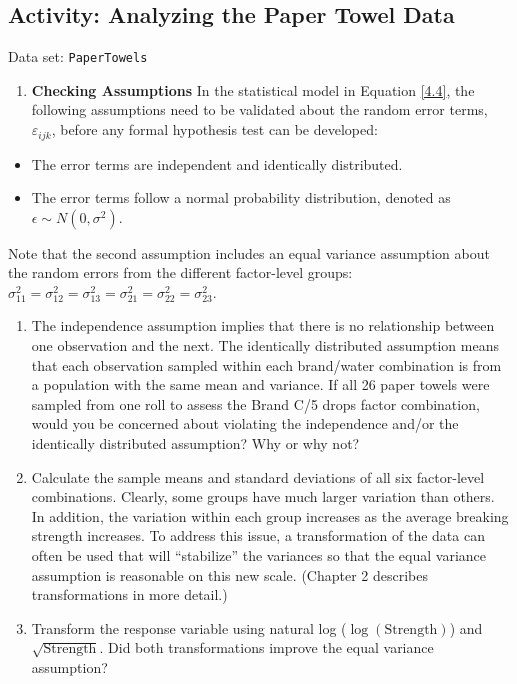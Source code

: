 \documentclass[
]{book}
\providecommand{\tightlist}{%
  \setlength{\itemsep}{0pt}\setlength{\parskip}{0pt}}
\begin{document}
\hypertarget{activity-analyzing-the-paper-towel-data}{%
\subsection*{Activity: Analyzing the Paper Towel Data}\label{activity-analyzing-the-paper-towel-data}}

Data set: \texttt{PaperTowels}

\begin{enumerate}
\def\labelenumi{\arabic{enumi}.}
\setcounter{enumi}{33}
\tightlist
\item
  \textbf{Checking Assumptions} In the statistical model in Equation \ref{4.4}, the following assumptions need to be validated about the random error terms, \(\varepsilon_{ijk}\), before any formal hypothesis test can be developed:
\end{enumerate}

\begin{itemize}
\tightlist
\item
  The error terms are independent and identically distributed.
\item
  The error terms follow a normal probability distribution, denoted as \(\epsilon \sim N(0, \sigma^2)\).
\end{itemize}

Note that the second assumption includes an equal variance assumption about the random errors from the different factor-level groups: \(\sigma_{11}^2 = \sigma_{12}^2 = \sigma_{13}^2 = \sigma_{21}^2 = \sigma_{22}^2 = \sigma_{23}^2\).

\begin{enumerate}
\def\labelenumi{\alph{enumi}.}
\item
  The independence assumption implies that there is no relationship between one observation and the next. The identically distributed assumption means that each observation sampled within each brand/water combination is from a population with the same mean and variance. If all 26 paper towels were sampled from one roll to assess the Brand C/5 drops factor combination, would you be concerned about violating the independence and/or the identically distributed assumption? Why or why not?
\item
  Calculate the sample means and standard deviations of all six factor-level combinations. Clearly, some groups have much larger variation than others. In addition, the variation within each group increases as the average breaking strength increases. To address this issue, a transformation of the data can often be used that will ``stabilize'' the variances so that the equal variance assumption is reasonable on this new scale. (Chapter 2 describes transformations in more detail.)
\item
  Transform the response variable using natural log (\(\log(\text{Strength})\)) and \(\sqrt{\text{Strength}}\). Did both transformations improve the equal variance assumption?
\end{enumerate}
\end{document}
